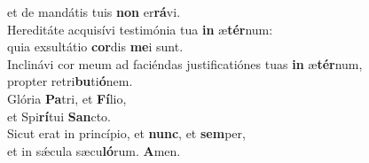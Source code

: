 \evenverse et de mandátis tuis \textbf{non} er\textbf{rá}vi.\\
\oddverse Hereditáte acquisívi testimónia tua \textbf{in} æ\textbf{tér}num:~\*\\
\oddverse quia exsultátio \textbf{cor}dis \textbf{me}i sunt.\\
\evenverse Inclinávi cor meum ad faciéndas justificatiónes tuas \textbf{in} æ\textbf{tér}num,~\*\\
\evenverse propter retri\textbf{bu}ti\textbf{ó}nem.\\
\oddverse Glória \textbf{Pa}tri, et \textbf{Fí}lio,~\*\\
\oddverse et Spi\textbf{rí}tui \textbf{San}cto.\\
\evenverse Sicut erat in princípio, et \textbf{nunc}, et \textbf{sem}per,~\*\\
\evenverse et in sǽcula sæcu\textbf{ló}rum. \textbf{A}men.\\
